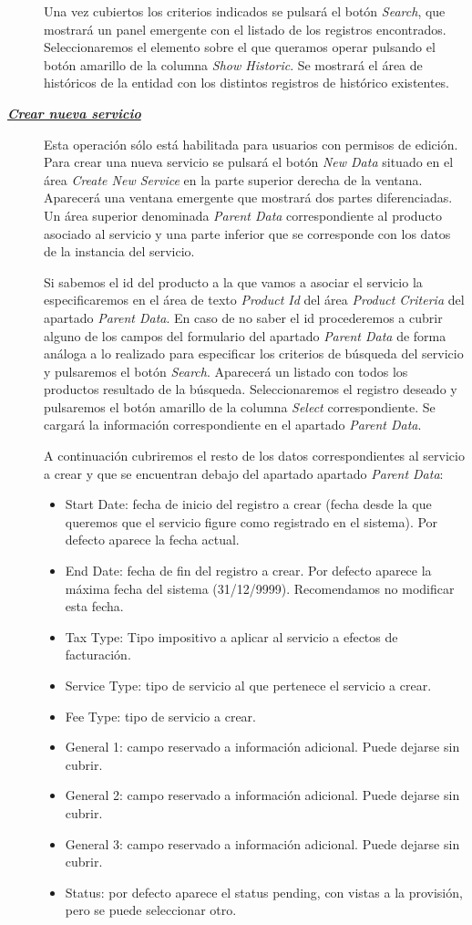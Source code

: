 \begin{description}
Una vez cubiertos los criterios indicados se pulsará el botón \emph{Search}, que mostrará un panel emergente con el listado de los registros encontrados. Seleccionaremos el elemento sobre el que queramos operar pulsando el botón amarillo de la columna \emph{Show Historic}. Se mostrará el área de históricos de la entidad con los distintos registros de histórico existentes.

\item[\underline{\textsl{\textbf{Crear nueva servicio}}}] Esta operación sólo está habilitada para usuarios con permisos de edición.
Para crear una nueva servicio se pulsará el botón \textit{New Data} situado en el área \emph{Create New Service} en la parte superior derecha de la ventana. Aparecerá una ventana emergente que mostrará dos partes diferenciadas. Un área superior denominada \emph{Parent Data} correspondiente al producto asociado al servicio y una parte inferior que se corresponde con los datos de la instancia del servicio.

Si sabemos el id del producto a la que vamos a asociar el servicio la especificaremos en el área de texto \emph{Product Id} del área \emph{Product Criteria} del apartado \emph{Parent Data}. En caso de no saber el id procederemos a cubrir alguno de los campos del formulario del apartado \emph{Parent Data} de forma análoga a lo realizado para especificar los criterios de búsqueda del servicio y pulsaremos el botón \emph{Search}. Aparecerá un listado con todos los productos resultado de la búsqueda. Seleccionaremos el registro deseado y pulsaremos el botón amarillo de la columna \emph{Select} correspondiente. Se cargará la información correspondiente en el apartado \emph{Parent Data}.

A continuación cubriremos el resto de los datos correspondientes al servicio a crear y que se encuentran debajo del apartado apartado \emph{Parent Data}:
\begin{itemize}
	\item Start Date: fecha de inicio del registro a crear (fecha desde la que queremos que el servicio figure como registrado en el sistema). Por defecto aparece la fecha actual.
	\item End Date: fecha de fin del registro a crear. Por defecto aparece la máxima fecha del sistema (31/12/9999). Recomendamos no modificar esta fecha.
	\item Tax Type: Tipo impositivo a aplicar al servicio a efectos de facturación.
	\item Service Type: tipo de servicio al que pertenece el servicio a crear.	
		\item Fee Type: tipo de servicio a crear. 
	\item General 1: campo reservado a información adicional. Puede dejarse sin cubrir.
	\item General 2: campo reservado a información adicional. Puede dejarse sin cubrir.
	\item General 3: campo reservado a información adicional. Puede dejarse sin cubrir.
	\item Status: por defecto aparece el status pending, con vistas a la provisión, pero se puede seleccionar otro.
\end{itemize}


\end{description}
